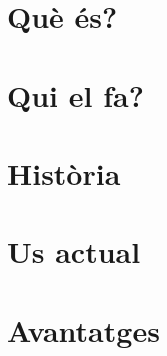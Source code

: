 \section{Què és?}

\section{Qui el fa?}

\section{Història}

\section{Us actual}

\section{Avantatges}
